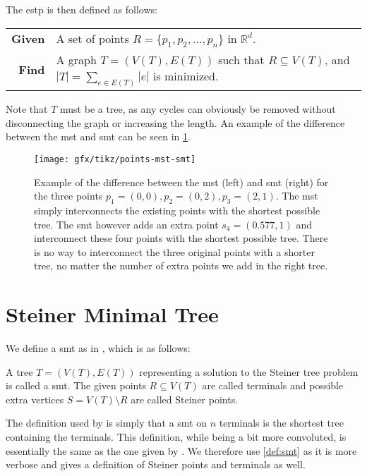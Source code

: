 The \ac{estp} is then defined as follows:
%
\begin{center}
  \begin{tabular}{rp{9cm}}
    \toprule
    \textbf{Given} & A set of points $R = \{ p_1, p_2, \ldots, p_n \}$ in
                     $\mathbb{R}^d$. \\
    \textbf{Find} & A graph $T = (V(T), E(T))$ such that $R \subseteq V(T)$, and
                    $|T| = \sum_{e \in E(T)} |e|$ is minimized. \\
    \bottomrule
  \end{tabular}
\end{center}
%
Note that $T$ must be a tree, as any cycles can obviously be removed without
disconnecting the graph or increasing the length. An example of the difference
between the \ac{mst} and \ac{smt} can be seen in \cref{fig:points-mst-smt}.
%
\begin{figure}[htbp]
  \centering
  \texttt{[image: gfx/tikz/points-mst-smt]}
  \caption[\acs{mst} vs. \acs{smt}]{Example of the difference between the \acs{mst} (left)
    and \acs{smt} (right) for the three points $p_1 = (0,0), p_2 = (0, 2), p_3 = (2,
    1)$. The \acs{mst} simply interconnects the existing points with the shortest
    possible tree. The \acs{smt} however adds an extra point $s_4 = (0.577, 1)$
    and interconnect these four points with the shortest possible tree. There is
    no way to interconnect the three original points with a shorter tree, no
    matter the number of extra points we add in the right tree.\label{fig:points-mst-smt}}
\end{figure}

\section{Steiner Minimal Tree}
\label{sec:steiner-minimal-tree}

We define a \ac{smt} as in \textcite{brazil2015}, which is as follows:
%
\begin{definition}
  A tree $T = (V(T), E(T))$ representing a solution to the Steiner tree problem
  is called a \acl{smt}. The given points $R \subseteq V(T)$ are called
  terminals and possible extra vertices $S = V(T) \setminus R$ are called
  Steiner points.\label{def:smt}
\end{definition}
%
The definition used by \textcite{smith1992} is simply that a \ac{smt} on $n$
terminals is the shortest tree containing the terminals. This definition, while being
a bit more convoluted, is essentially the same as the one given by
\textcite{brazil2015}. We therefore use \cref{def:smt} as it is more verbose and
gives a definition of Steiner points and terminals as well.

